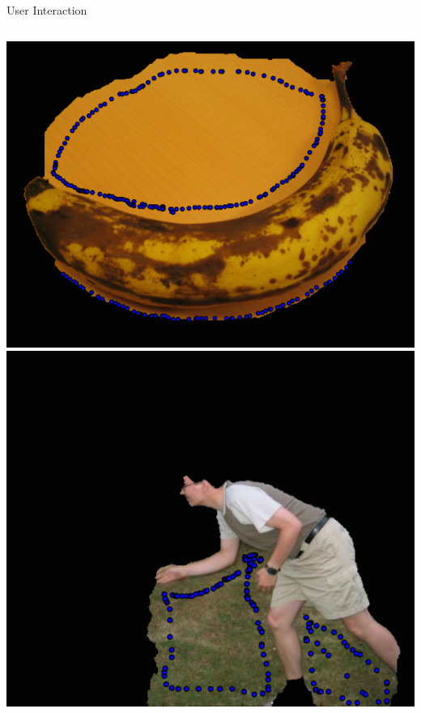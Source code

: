 \documentclass[compress,aspectratio=43]{beamer}
\begin{document}
\begin{frame}{User Interaction}
\begin{columns}[t]
{\includegraphics[width=1\linewidth]{figures/user_interaction/banana/user_interaction.png}\\
\includegraphics[width=1\linewidth]{figures/user_interaction/bool/user_interaction.png}
}
\end{columns}
\end{frame}
\end{document}
